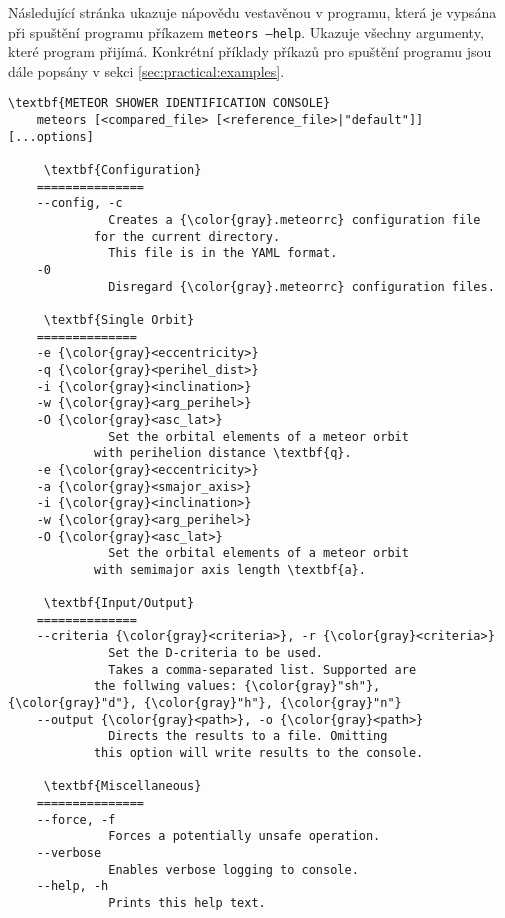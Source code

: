 \medskip

Následující stránka ukazuje nápovědu vestavěnou v programu, která je vypsána při spuštění programu příkazem \texttt{meteors ---help}. Ukazuje všechny argumenty, které program přijímá. Konkrétní příklady příkazů pro spuštění programu jsou dále popsány v sekci \ref{sec:practical:examples}.

\pagebreak
\begin{Verbatim}[commandchars=\\\{\},gobble=4,formatcom=\footnotesize,codes={\catcode`$=3\catcode`^=7},frame=lines]
    \textbf{METEOR SHOWER IDENTIFICATION CONSOLE}
    meteors [<compared_file> [<reference_file>|"default"]] [...options]

     \textbf{Configuration}
    ===============
    --config, -c
              Creates a {\color{gray}.meteorrc} configuration file
            for the current directory.
              This file is in the YAML format.
    -0
              Disregard {\color{gray}.meteorrc} configuration files.

     \textbf{Single Orbit}
    ==============
    -e {\color{gray}<eccentricity>}
    -q {\color{gray}<perihel_dist>}
    -i {\color{gray}<inclination>}
    -w {\color{gray}<arg_perihel>}
    -O {\color{gray}<asc_lat>}
              Set the orbital elements of a meteor orbit
            with perihelion distance \textbf{q}.
    -e {\color{gray}<eccentricity>}
    -a {\color{gray}<smajor_axis>}
    -i {\color{gray}<inclination>}
    -w {\color{gray}<arg_perihel>}
    -O {\color{gray}<asc_lat>}
              Set the orbital elements of a meteor orbit
            with semimajor axis length \textbf{a}.

     \textbf{Input/Output}
    ==============
    --criteria {\color{gray}<criteria>}, -r {\color{gray}<criteria>}
              Set the D-criteria to be used.
              Takes a comma-separated list. Supported are
            the follwing values: {\color{gray}"sh"}, {\color{gray}"d"}, {\color{gray}"h"}, {\color{gray}"n"}
    --output {\color{gray}<path>}, -o {\color{gray}<path>}
              Directs the results to a file. Omitting
            this option will write results to the console.

     \textbf{Miscellaneous}
    ===============
    --force, -f
              Forces a potentially unsafe operation.
    --verbose
              Enables verbose logging to console.
    --help, -h
              Prints this help text.
\end{Verbatim}
\pagebreak


